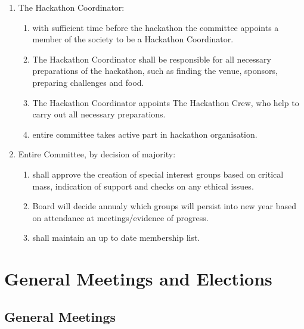 \documentclass{report}
\begin{document}
\begin{enumerate}
		\item{The Hackathon Coordinator:
			\begin{enumerate}
				\item{with sufficient time before the hackathon the committee appoints a member of the society to be a Hackathon Coordinator.}
				\item{The Hackathon Coordinator shall be responsible for all necessary preparations of the hackathon, such as finding the venue, sponsors, preparing challenges and food.}
				\item{The Hackathon Coordinator appoints The Hackathon Crew, who help to carry out all necessary preparations.}
				\item{entire committee takes active part in hackathon organisation.}
			\end{enumerate}
		}
		\item{Entire Committee, by decision of majority:
			\begin{enumerate}
				\item{shall approve the creation of special interest groups based on critical mass, indication of support and checks on any ethical issues.}
				\item{Board will decide annualy which groups will persist into new year based on attendance at meetings/evidence of progress.}
				\item{shall maintain an up to date membership list.}
			\end{enumerate}
		}
	\end{enumerate}

\chapter{General Meetings and Elections}


\section{General Meetings}
\end{document}

